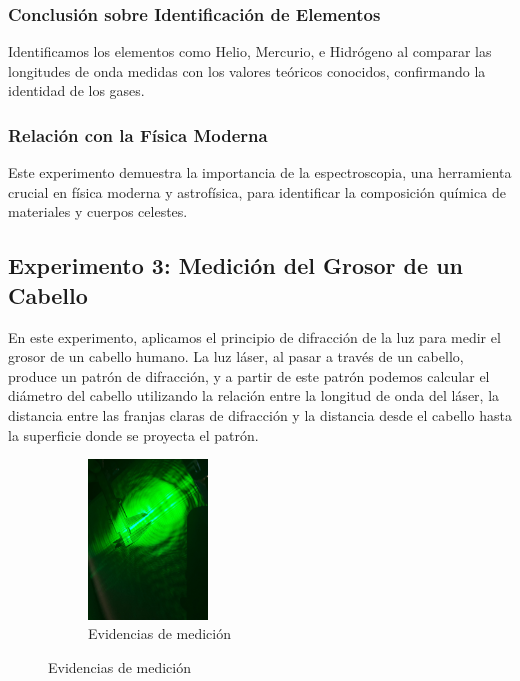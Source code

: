 \subsubsection{Conclusión sobre Identificación de Elementos}
Identificamos los elementos como Helio, Mercurio, e Hidrógeno al comparar las longitudes de onda medidas con los valores teóricos conocidos, confirmando la identidad de los gases.

\subsubsection{Relación con la Física Moderna}
Este experimento demuestra la importancia de la espectroscopia, una herramienta crucial en física moderna y astrofísica, para identificar la composición química de materiales y cuerpos celestes.

\subsection{Experimento 3: Medición del Grosor de un Cabello}
En este experimento, aplicamos el principio de difracción de la luz para medir el grosor de un cabello humano. La luz láser, al pasar a través de un cabello, produce un patrón de difracción, y a partir de este patrón podemos calcular el diámetro del cabello utilizando la relación entre la longitud de onda del láser, la distancia entre las franjas claras de difracción y la distancia desde el cabello hasta la superficie donde se proyecta el patrón.

\begin{figure}[H]
  \centering
  \begin{subfigure}[b]{\textwidth}
      \centering
      \includegraphics[width=0.35\textwidth]{Figures/1. Content/experimento-3.jpeg}
      \caption{Evidencias de medición}
      \label{fig: Evidencias de medicion 3}
  \end{subfigure}
  \hfill
\end{figure}

